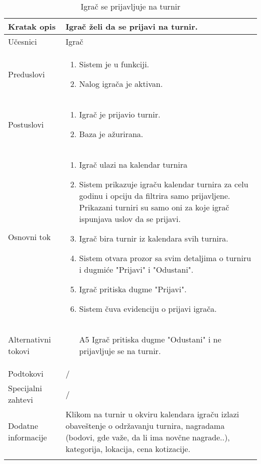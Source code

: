 \documentclass{article}
\begin{document}
        \begin{longtable}{| p{} | p{} |} 
            \hline
                Kratak opis & Igrač želi da se prijavi na turnir.\\ 
            \hline    
                Učesnici & Igrač \\
            \hline
               Preduslovi & \begin{enumerate}
                   \item Sistem je u funkciji.
                   \item Nalog igrača je aktivan.
               \end{enumerate}\\
            \hline  
                Postuslovi & \begin{enumerate}
                    \item Igrač je prijavio turnir.
                    \item Baza je ažurirana.
                \end{enumerate}\\
            \hline
                Osnovni tok & \begin{enumerate}
                    \item Igrač ulazi na kalendar turnira
                    \item Sistem prikazuje igraču kalendar turnira za celu godinu i opciju da filtrira samo prijavljene. Prikazani turniri su samo oni za koje igrač ispunjava uslov da se prijavi. 
                    \item Igrač bira turnir iz kalendara svih turnira.
                    \item Sistem otvara prozor sa svim detaljima o turniru i dugmiće "Prijavi" i "Odustani".
                    \item Igrač pritiska dugme "Prijavi".        
                    \item Sistem čuva evidenciju o prijavi igrača.
                \end{enumerate}\\
            \hline
                Alternativni tokovi & 
                \begin{itemize}
                    \item[A5] Igrač pritiska dugme "Odustani" i ne prijavljuje se na turnir.
                \end{itemize}\\
            \hline
                Podtokovi & /\\
            \hline
                Specijalni zahtevi & /\\
            \hline
                Dodatne informacije & Klikom na turnir u okviru kalendara igraču izlazi obaveštenje o održavanju turnira, nagradama (bodovi, gde važe, da li ima novčne nagrade..), kategorija, lokacija, cena kotizacije. \\
            \hline
            \caption{Igrač se prijavljuje na turnir} 
        \end{longtable}
        
\end{document}
